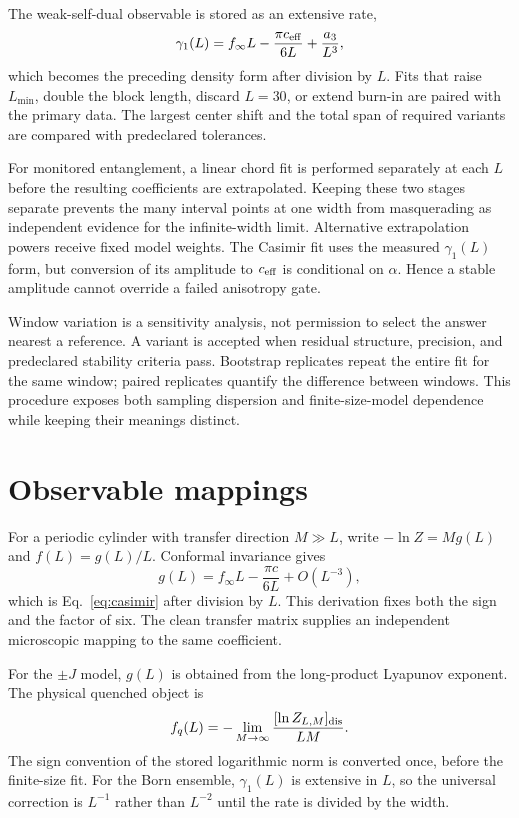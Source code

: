 \documentclass[aps,prb,reprint,superscriptaddress,longbibliography,floatfix]{revtex4-2}
\begin{document}
The weak-self-dual observable is stored as an extensive rate,
\begin{equation}
 \gamma_1(L)=f_\infty L-\frac{\pi c_{\rm eff}}{6L}
             +\frac{a_3}{L^3},
\end{equation}
which becomes the preceding density form after division by $L$.  Fits that
raise $L_{\min}$, double the block length, discard $L=30$, or extend burn-in
are paired with the primary data.  The largest center shift and the total
span of required variants are compared with predeclared tolerances.

For monitored entanglement, a linear chord fit is performed separately at
each $L$ before the resulting coefficients are extrapolated.  Keeping these
two stages separate prevents the many interval points at one width from
masquerading as independent evidence for the infinite-width limit.
Alternative extrapolation powers receive fixed model weights.  The Casimir
fit uses the measured $\gamma_1(L)$ form, but conversion of its amplitude to
$c_{\rm eff}$ is conditional on $\alpha$.  Hence a stable amplitude cannot
override a failed anisotropy gate.

Window variation is a sensitivity analysis, not permission to select the
answer nearest a reference.  A variant is accepted when residual structure,
precision, and predeclared stability criteria pass.  Bootstrap replicates
repeat the entire fit for the same window; paired replicates quantify the
difference between windows.  This procedure exposes both sampling dispersion
and finite-size-model dependence while keeping their meanings distinct.

\section{Observable mappings}
\label{app:mappings}

For a periodic cylinder with transfer direction $M\gg L$, write
$-\ln Z=M g(L)$ and $f(L)=g(L)/L$.  Conformal invariance gives
\begin{equation}
 g(L)=f_\infty L-\frac{\pi c}{6L}+O(L^{-3}),
\end{equation}
which is Eq.~\eqref{eq:casimir} after division by $L$.  This derivation fixes
both the sign and the factor of six.  The clean transfer matrix supplies an
independent microscopic mapping to the same coefficient.

For the $\pm J$ model, $g(L)$ is obtained from the long-product Lyapunov
exponent.  The physical quenched object is
\begin{equation}
 f_q(L)=-\lim_{M\rightarrow\infty}\frac{[\ln Z_{L,M}]_{\rm dis}}{LM}.
\end{equation}
The sign convention of the stored logarithmic norm is converted once, before
the finite-size fit.  For the Born ensemble, $\gamma_1(L)$ is extensive in
$L$, so the universal correction is $L^{-1}$ rather than $L^{-2}$ until the
rate is divided by the width.
\end{document}
